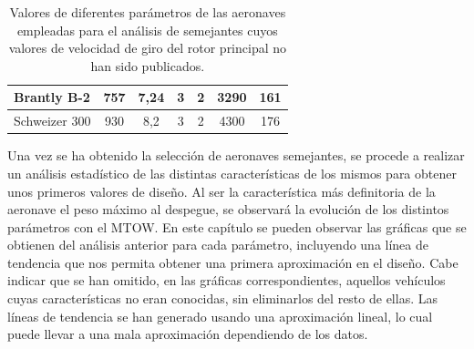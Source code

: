 \begin{table}[htbp]
\begin{tabular}{|l|c|c|c|c|c|c|}
		\hline
		\rowcolor[rgb]{ .949,  .949,  .949} Brantly B-2 & \cellcolor[rgb]{ 1,  1,  1}757 & \cellcolor[rgb]{ 1,  1,  1}7,24 & \cellcolor[rgb]{ 1,  1,  1}3 & \cellcolor[rgb]{ 1,  1,  1}2 & \cellcolor[rgb]{ 1,  1,  1}3290 & \cellcolor[rgb]{ 1,  1,  1}161 \\
		\hline
		\rowcolor[rgb]{ .949,  .949,  .949} Schweizer 300 & \cellcolor[rgb]{ 1,  1,  1}930 & \cellcolor[rgb]{ 1,  1,  1}8,2 & \cellcolor[rgb]{ 1,  1,  1}3 & \cellcolor[rgb]{ 1,  1,  1}2 & \cellcolor[rgb]{ 1,  1,  1}4300 & \cellcolor[rgb]{ 1,  1,  1}176 \\
		\hline
	\end{tabular}%
	\caption{Valores de diferentes parámetros de las aeronaves empleadas para el análisis de semejantes cuyos valores de velocidad de giro del rotor principal no han sido publicados.}
	\label{AS}
\end{table}%



Una vez se ha obtenido la selección de aeronaves semejantes, se procede a realizar un análisis estadístico de las distintas características de los mismos para obtener unos primeros valores de diseño. Al ser la característica más definitoria de la aeronave el peso máximo al despegue, se observará la evolución de los distintos parámetros con el MTOW.
En este capítulo se pueden observar las gráficas que se obtienen del análisis anterior para cada parámetro, incluyendo una línea de tendencia que nos permita obtener una primera aproximación en el diseño. Cabe indicar que se han omitido, en las gráficas correspondientes, aquellos vehículos cuyas características no eran conocidas, sin eliminarlos del resto de ellas. Las líneas de tendencia se han generado usando una aproximación lineal, lo cual puede llevar a una mala aproximación dependiendo de los datos.


